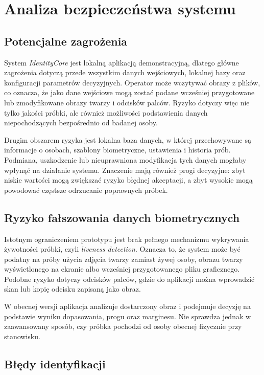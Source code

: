 \chapter{Analiza bezpieczeństwa systemu}
\label{chap:bezpieczenstwo}

\section{Potencjalne zagrożenia}

System \textit{IdentityCore} jest lokalną aplikacją demonstracyjną, dlatego główne zagrożenia dotyczą przede wszystkim danych wejściowych, lokalnej bazy oraz konfiguracji parametrów decyzyjnych. Operator może wczytywać obrazy z plików, co oznacza, że jako dane wejściowe mogą zostać podane wcześniej przygotowane lub zmodyfikowane obrazy twarzy i odcisków palców. Ryzyko dotyczy więc nie tylko jakości próbki, ale również możliwości podstawienia danych niepochodzących bezpośrednio od badanej osoby.

Drugim obszarem ryzyka jest lokalna baza danych, w której przechowywane są informacje o osobach, szablony biometryczne, ustawienia i historia prób. Podmiana, uszkodzenie lub nieuprawniona modyfikacja tych danych mogłaby wpłynąć na działanie systemu. Znaczenie mają również progi decyzyjne: zbyt niskie wartości mogą zwiększać ryzyko błędnej akceptacji, a zbyt wysokie mogą powodować częstsze odrzucanie poprawnych próbek.

\section{Ryzyko fałszowania danych biometrycznych}

Istotnym ograniczeniem prototypu jest brak pełnego mechanizmu wykrywania żywotności próbki, czyli \textit{liveness detection}. Oznacza to, że system może być podatny na próby użycia zdjęcia twarzy zamiast żywej osoby, obrazu twarzy wyświetlonego na ekranie albo wcześniej przygotowanego pliku graficznego. Podobne ryzyko dotyczy odcisków palców, gdzie do aplikacji można wprowadzić skan lub kopię odcisku zapisaną jako obraz.

W obecnej wersji aplikacja analizuje dostarczony obraz i podejmuje decyzję na podstawie wyniku dopasowania, progu oraz marginesu. Nie sprawdza jednak w zaawansowany sposób, czy próbka pochodzi od osoby obecnej fizycznie przy stanowisku.

\section{Błędy identyfikacji}

